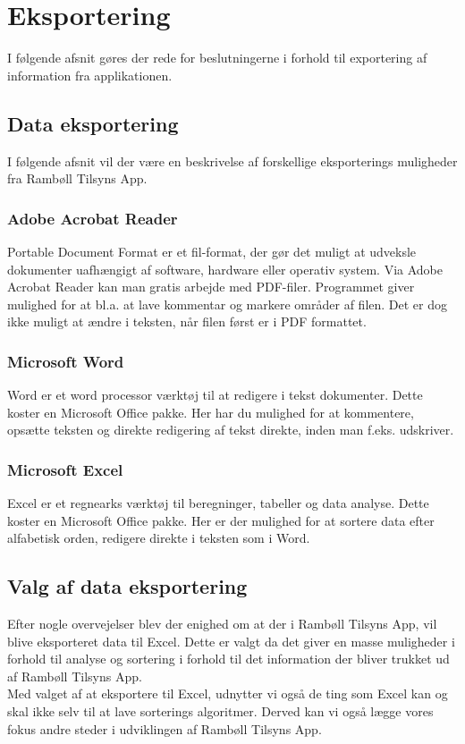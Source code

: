 \section{Eksportering}                                   
I følgende afsnit gøres der rede for beslutningerne i forhold til exportering af information fra applikationen.

\subsection{Data eksportering}
I følgende afsnit vil der være en beskrivelse af forskellige eksporterings muligheder fra Rambøll Tilsyns App.

\subsubsection{Adobe Acrobat Reader}
Portable Document Format\cite{PDF} er et fil-format, der gør det muligt at udveksle dokumenter uafhængigt af software, hardware eller operativ system.
Via Adobe Acrobat Reader\cite{AdobeReader} kan man gratis arbejde med PDF-filer. Programmet giver mulighed for at bl.a. at lave kommentar og markere områder af filen. Det er dog ikke muligt at ændre i teksten, når filen først er i PDF formattet.

\subsubsection{Microsoft Word}
Word\cite{Office} er et word processor\cite{WordProcessor} værktøj til at redigere i tekst dokumenter.
Dette koster en Microsoft Office pakke. Her har du mulighed for at kommentere, opsætte teksten og direkte redigering af tekst direkte, inden man f.eks. udskriver.

\subsubsection{Microsoft Excel}
Excel\cite{Office} er et regnearks værktøj til beregninger, tabeller og data analyse. 
Dette koster en Microsoft Office pakke. Her er der mulighed for at sortere data efter alfabetisk orden, redigere direkte i teksten som i Word.

\subsection{Valg af data eksportering}
Efter nogle overvejelser blev der enighed om at der i Rambøll Tilsyns App, vil blive eksporteret data til Excel. Dette er valgt da det giver en masse muligheder i forhold til analyse og sortering i forhold til det information der bliver trukket ud af Rambøll Tilsyns App. \\
Med valget af at eksportere til Excel, udnytter vi også de ting som Excel kan og skal ikke selv til at lave sorterings algoritmer. Derved kan vi også lægge vores fokus andre steder i udviklingen af Rambøll Tilsyns App.